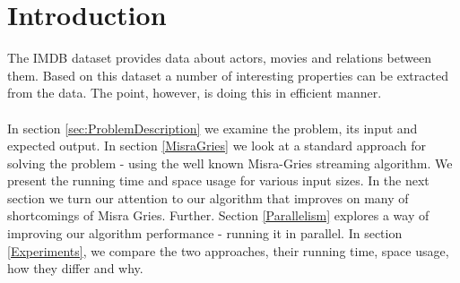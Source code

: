 \label{Introduction}
\section{Introduction}

The IMDB dataset provides data about actors, movies and relations between them. Based on this dataset a number of interesting properties can be extracted from the data. The point, however, is doing this in efficient manner.
\\
\\
In section \ref{sec:ProblemDescription} we examine the problem, its input and expected output. In section \ref{MisraGries} we look at a standard approach for solving the problem - using the well known Misra-Gries streaming algorithm. We present the running time and space usage for various input sizes. In the next section we turn our attention to our algorithm that improves on many of shortcomings of Misra Gries. Further. Section \ref{Parallelism} explores a way of improving our algorithm performance - running it in parallel. In section \ref{Experiments}, we compare the two approaches, their running time, space usage, how they differ and why.
